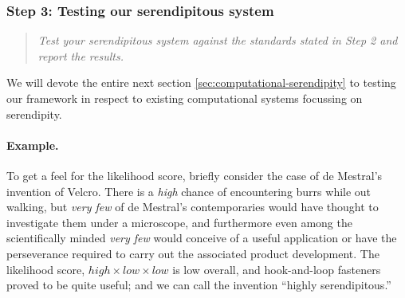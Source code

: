 \subsubsection*{Step 3: Testing our serendipitous system}

\begin{quote} {\em Test your serendipitous system against the standards stated in Step 2 and report the
results.}\end{quote}

\noindent We will devote the entire next section \ref{sec:computational-serendipity} to testing our framework in respect to existing computational systems focussing on serendipity. 

\paragraph{Example.}
To get a feel for the likelihood score, briefly consider the case of
de Mestral's invention of Velcro\texttrademark.  There is a
\emph{high} chance of encountering burrs while out walking, but
\emph{very few} of de Mestral's contemporaries would have thought to
investigate them under a microscope, and furthermore even among the
scientifically minded \emph{very few} would conceive of a useful
application or have the perseverance required to carry out the
associated product development.  The likelihood score,
$\mathit{high}\times\mathit{low}\times\mathit{low}$ is low overall,
and hook-and-loop fasteners proved to be quite useful; and we can call
the invention ``highly serendipitous.''

